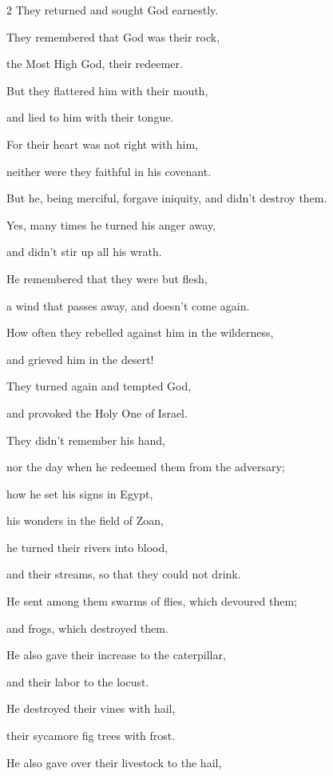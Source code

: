 \begin{multicols}{2}
	They returned and sought God earnestly.
	
	
	\myverse{}They remembered that God was their rock,
	
	the Most High God, their redeemer.
	
	
	\myverse{}But they flattered him with their mouth,
	
	and lied to him with their tongue.
	
	
	\myverse{}For their heart was not right with him,
	
	neither were they faithful in his covenant.
	
	
	\myverse{}But he, being merciful, forgave iniquity, and didn’t destroy
	them.
	
	Yes, many times he turned his anger away,
	
	and didn’t stir up all his wrath.
	
	
	\myverse{}He remembered that they were but flesh,
	
	a wind that passes away, and doesn’t come again.
	
	
	\myverse{}How often they rebelled against him in the wilderness,
	
	and grieved him in the desert!
	
	
	\myverse{}They turned again and tempted God,
	
	and provoked the Holy One of Israel.
	
	
	\myverse{}They didn’t remember his hand,
	
	nor the day when he redeemed them from the adversary;
	
	
	\myverse{}how he set his signs in Egypt,
	
	his wonders in the field of Zoan,
	
	
	\myverse{}he turned their rivers into blood,
	
	and their streams, so that they could not drink.
	
	
	\myverse{}He sent among them swarms of flies, which devoured them;
	
	and frogs, which destroyed them.
	
	
	\myverse{}He also gave their increase to the caterpillar,
	
	and their labor to the locust.
	
	
	\myverse{}He destroyed their vines with hail,
	
	their sycamore fig trees with frost.
	
	
	\myverse{}He also gave over their livestock to the hail,
	

\end{multicols}
